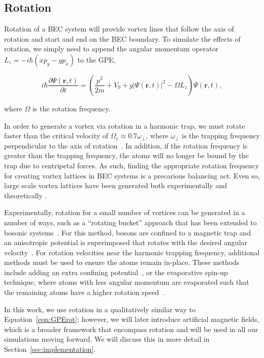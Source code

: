 \subsection{Rotation}

\label{sec:rot}
Rotation of a BEC system will provide vortex lines that follow the axis of rotation and start and end on the BEC boundary.
To simulate the effects of rotation, we simply need to append the angular momentum operator $L_z = -i\hbar(xp_y - yp_x)$ to the GPE,

\begin{equation}
i \hbar \frac{\partial \Psi(\mathbf{r},t)}{\partial t} = \left(\frac{p^2}{2m} + V_0 + g |\Psi(\mathbf{r},t)|^2 -\Omega L_z \right)\Psi(\mathbf{r},t),
\label{eqn:GPErot}
\end{equation}

\noindent where $\Omega$ is the rotation frequency. 

In order to generate a vortex via rotation in a harmonic trap, we must rotate faster than the critical velocity of $\Omega_c \approx 0.7 \omega_\perp$, where $\omega_\perp$ is the trapping frequency perpendicular to the axis of rotation~\cite{fetter2009}.
In addition, if the rotation frequency is greater than the trapping frequency, the atoms will no longer be bound by the trap due to centripetal forces.
As such, finding the appropriate rotation frequency for creating vortex lattices in BEC systems is a precarious balancing act.
Even so, large scale vortex lattices have been generated both experimentally and theoretically \cite{o2016, o2016topo, abo2001, schweikhard2004}.

Experimentally, rotation for a small number of vortices can be generated in a number of ways, such as a ``rotating bucket'' approach that has been extended to bosonic systems~\cite{chevy2006}.
For this method, bosons are confined to a magnetic trap and an anisotropic potential is superimposed that rotates with the desired angular velocity~\cite{madison2000,abo2001,hodby2001,haljan2001}.
For rotation velocities near the harmonic trapping frequency, additional methods must be used to ensure the atoms remain in-place.
These methods include adding an extra confining potential~\cite{bretin2004}, or the evaporative spin-up technique, where atoms with less angular momentum are evaporated such that the remaining atoms have a higher rotation speed~\cite{schweikhard2004,engels2003}.


In this work, we use rotation in a qualitatively similar way to Equation~\eqref{eqn:GPErot}; however, we will later introduce artificial magnetic fields, which is a broader framework that encompass rotation and will be used in all our simulations moving forward.
We will discuss this in more detail in Section~\ref{sec:implementation}.

